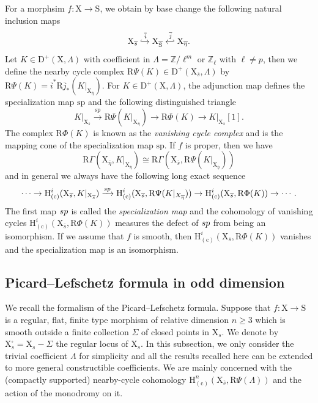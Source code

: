 \documentclass[10pt]{amsart}
\numberwithin{equation}{section}
\theoremstyle{definition}
\def\ZZ{\mathbb{Z}}
\def\rmc{\mathrm{c}}
\def\rmD{\mathrm{D}}
\def\rmR{\mathrm{R}}
\def\rmS{\mathrm{S}}
\def\rmX{\mathrm{X}}
\begin{document}
For a morphsim $f: \rmX\rightarrow \rmS$, we obtain by base change the following natural inclusion maps
\begin{equation*}
\rmX_{\overline{s}}\xhookrightarrow{\overline{i}} \rmX_{\overline{\rmS}} \xhookleftarrow{\overline{j}} \rmX_{\overline{\eta}}.
\end{equation*}
Let $K\in \rmD^{+}(\rmX, \Lambda)$ with coefficient in $\Lambda=\mathbb{Z}/ \ell^{m}$ or $\ZZ_{\ell}$ with $\ell\neq p$, then we define the {nearby cycle complex} $\rmR\Psi(K)\in \rmD^{+}(\rmX_{\overline{s}}, \Lambda)$ by $\rmR\Psi(K)= \overline{i}^{*}\rmR\overline{j}_{*}(K|_{\rmX_{\overline{\eta}}})$.
For $K\in \rmD^{+}(\rmX, \Lambda)$, the adjunction map defines the specialization map $\mathrm{sp}$ and the following distinguished triangle
\begin{equation}\label{sp-triangle}
K\vert_{\rmX_{\overline{s}}}\xrightarrow{\mathrm{sp}} \rmR\Psi(K\vert_{\rmX_{\overline{\eta}}})\rightarrow \rmR\Phi(K)\rightarrow K\vert_{\rmX_{\overline{s}}}[1].
\end{equation}
The complex $\rmR\Phi(K)$ is known as the \emph{vanishing cycle complex} and is the mapping cone of the specialization map $\mathrm{sp}$. If $f$ is proper, then we have 
\begin{equation*}
\rmR\Gamma(\rmX_{\overline{\eta}}, K\vert_{\rmX_{\overline{\eta}}})\cong \rmR\Gamma(\rmX_{\overline{s}}, \rmR\Psi(K\vert_{\rmX_{\overline{\eta}}}))
\end{equation*}
and in general we always have the following long exact sequence 
\begin{equation*}
\cdots \rightarrow \mathrm{H}^{i}_{(\rmc)}(\rmX_{\overline{s}}, K\vert_{\rmX_{\overline{s}}})\xrightarrow{\rm{sp}}\mathrm{H}^{i}_{(\rmc)}(\rmX_{\overline{s}}, \rmR\Psi(K\vert_{X_{\overline{\eta}}})) \rightarrow  \mathrm{H}^{i}_{(\rmc)}(\rmX_{\overline{s}}, \rmR\Phi(K))\rightarrow \cdots.
\end{equation*}
The first map $\rm{sp}$ is called the \emph{specialization map} and the cohomology of vanishing cycles  $\mathrm{H}^{i}_{(\rmc)}(\rmX_{\overline{s}}, \rmR\Phi(K))$ measures the defect of $\rm{sp}$ from being an isomorphism. If we assume that $f$ is smooth, then  $\mathrm{H}^{i}_{(\rmc)}(\rmX_{\overline{s}}, \rmR\Phi(K))$ vanishes and the specialization map is an isomorphism.
\subsection{Picard--Lefschetz formula in odd dimension}
We recall the formalism of the Picard--Lefschetz formula. Suppose that $f: \rmX\rightarrow \rmS$ is a regular, flat, finite type morphism of relative dimension $n\geq 3$ which is smooth outside a finite collection $\Sigma$ of closed points in $\rmX_{s}$. We denote by $\rmX^{\square}_{s}=\rmX_{s}-\Sigma$ the regular locus of $\rmX_{s}$. In this subsection, we only consider the trivial coefficient $\Lambda$ for simplicity and all the results recalled here can be extended to more general constructible coefficients. We are mainly concerned with the (compactly supported) nearby-cycle cohomology $\mathrm{H}^{n}_{(\rmc)}(\rmX_{\overline{s}}, \rmR\Psi(\Lambda))$ and the action of the monodromy on it. 
\end{document}
